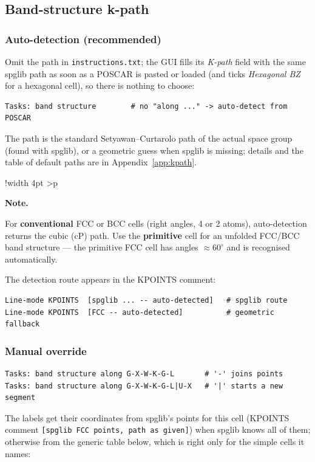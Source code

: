 \documentclass[11pt,a4paper]{scrartcl}
\newlength{\boxwidth}
\newenvironment{notebox}{%
  \par\vspace{6pt}%
  \setlength{\tabcolsep}{5pt}%
  \setlength{\boxwidth}{\dimexpr\linewidth - 4pt - 2\tabcolsep}%
  \noindent\begin{tabular}{!{\color{notebar}\vrule width 4pt}%
      >{\columncolor{notebg}}p{\boxwidth}}%
  \rule{0pt}{11pt}\textbf{\textcolor{notebar}{Note.}}\enspace\ignorespaces%
}{%
  \rule[-4pt]{0pt}{4pt}%
  \end{tabular}\par\vspace{6pt}%
}
\begin{document}
\subsection{Band-structure k-path}
\label{sec:kpath}

\subsubsection{Auto-detection (recommended)}

Omit the path in \texttt{instructions.txt}; the GUI fills its \emph{K-path} field with the
same spglib path as soon as a POSCAR is pasted or loaded (and ticks \emph{Hexagonal BZ} for a
hexagonal cell), so there is nothing to choose:

\begin{lstlisting}
Tasks: band structure        # no "along ..." -> auto-detect from POSCAR
\end{lstlisting}

The path is the standard Setyawan--Curtarolo path of the actual space group (found with spglib), or a geometric guess when spglib is missing; details and the table of default paths are in Appendix~\ref{app:kpath}.

\begin{notebox}
For \textbf{conventional} FCC or BCC cells (right angles, 4 or 2 atoms),
auto-detection returns the cubic (cP) path.
Use the \textbf{primitive} cell for an unfolded FCC/BCC band structure ---
the primitive FCC cell has angles $\approx 60^\circ$ and is recognised
automatically.
\end{notebox}

The detection route appears in the KPOINTS comment:
\begin{lstlisting}
Line-mode KPOINTS  [spglib ... -- auto-detected]   # spglib route
Line-mode KPOINTS  [FCC -- auto-detected]          # geometric fallback
\end{lstlisting}
\subsubsection{Manual override}

\begin{lstlisting}
Tasks: band structure along G-X-W-K-G-L       # '-' joins points
Tasks: band structure along G-X-W-K-G-L|U-X   # '|' starts a new segment
\end{lstlisting}

The labels get their coordinates from spglib's points for this cell (KPOINTS comment
\texttt{[spglib FCC points, path as given]}) when spglib knows all of them; otherwise from the
generic table below, which is right only for the simple cells it names:
\end{document}
